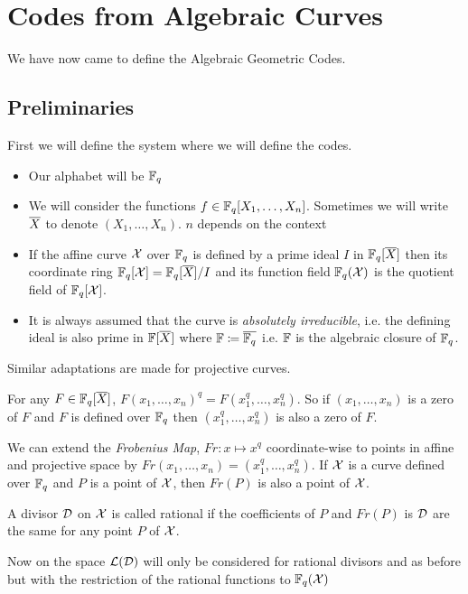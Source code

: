 \chapter{Codes from Algebraic Curves}
We have now came to define the Algebraic Geometric Codes.
\section{Preliminaries}
 First we will define the system where we will define the codes.
\begin{itemize}
	\item Our alphabet will be $\mathbb{F}_q$
	\item We will consider the functions $f\in \mathbb{F}_q[X_1,\dots, X_n]$. Sometimes we will write $\overline{X}$ to denote $(X_1,\dots, X_n)$. $n$ depends on the context
	\item If the affine curve $\mathcal{X}$ over $\mathbb{F}_q$ is defined by a prime ideal $I$ in $\mathbb{F}_q[\overline{X}]$ then its coordinate ring $\mathbb{F}_q[\mathcal{X}]=\mathbb{F}_q[\overline{X}]/I$ and its function field $\mathbb{F}_q(\mathcal{X})$ is the quotient field of $\mathbb{F}_q[\mathcal{X}]$.
	\item It is always assumed that the curve is \textit{absolutely irreducible}, i.e.  the defining ideal is also prime in $\mathbb{F}[\overline{X}]$ where $\mathbb{F}\coloneqq \overline{\mathbb{F}_q}$ i.e. $\mathbb{F}$ is the algebraic closure of $\mathbb{F}_q$.
\end{itemize}
Similar adaptations are made for projective curves. 

\begin{observation*}
	For any $F\in \mathbb{F}_q[\overline{X}]$, $F(x_1,\dots, x_n)^q=F(x_1^q,\dots, x_n^q)$. So if $(x_1,\dots, x_n)$ is a zero of $F$ and $F$ is defined over $\mathbb{F}_q$ then $(x_1^q,\dots, x_n^q)$ is also a zero of $F$.
\end{observation*}
We can extend the \textit{Frobenius Map}, $Fr:x\mapsto x^q$ coordinate-wise to points in affine and projective space by $Fr(x_1,\dots, x_n)=(x_1^q,\dots, x_n^q)$. If $\mathcal{X}$ is a curve defined over $\mathbb{F}_q$ and $P$ is a point of $\mathcal{X}$, then $Fr(P)$ is also a  point of $\mathcal{X}$.

\begin{definition}
	A divisor $\mathcal{D}$ on $\mathcal{X}$ is called rational if the coefficients of $P$ and $Fr(P)$ is $\mathcal{D}$ are the same for any point $P$ of $\mathcal{X}$.
\end{definition}
\begin{remark}
	Now on the space $\mathcal{L}(\mathcal{D})$ will only be considered for rational divisors and as before but with the restriction of the rational functions to $\mathbb{F}_q(\mathcal{X})$
\end{remark}


